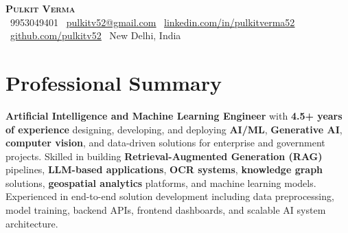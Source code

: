 \documentclass[letterpaper,11pt]{article}
\begin{document}
\begin{center}
    \textbf{\Huge \scshape Pulkit Verma} \\ \vspace{4pt}
    \small
    \faPhone\ 9953049401 \quad
    \faEnvelope\ \href{mailto:pulkitv52@gmail.com}{\underline{pulkitv52@gmail.com}} \quad
    \faLinkedin\ \href{https://www.linkedin.com/in/pulkitverma52/}{\underline{linkedin.com/in/pulkitverma52}} \quad
    \faGithub\ \href{https://github.com/pulkitv52}{\underline{github.com/pulkitv52}} \quad
    \faMapMarker*\ New Delhi, India
\end{center}

\section{Professional Summary}
\small{
\textbf{Artificial Intelligence and Machine Learning Engineer} with \textbf{4.5+ years of experience} designing, developing, and deploying \textbf{AI/ML}, \textbf{Generative AI}, \textbf{computer vision}, and data-driven solutions for enterprise and government projects. Skilled in building \textbf{Retrieval-Augmented Generation (RAG)} pipelines, \textbf{LLM-based applications}, \textbf{OCR systems}, \textbf{knowledge graph} solutions, \textbf{geospatial analytics} platforms, and machine learning models. Experienced in end-to-end solution development including data preprocessing, model training, backend APIs, frontend dashboards, and scalable AI system architecture.
}

\end{document}
